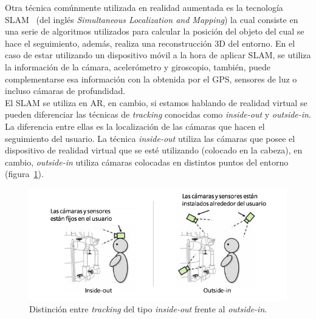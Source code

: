 Otra técnica comúnmente utilizada en realidad aumentada es la tecnología SLAM~\cite{arSLAM} (del inglés \textit{Simultaneous Localization and Mapping}) la cual consiste en una serie de algoritmos utilizados para calcular la posición del objeto del cual se hace el seguimiento, además, realiza una reconstrucción 3D del entorno. En el caso de estar utilizando un dispositivo móvil a la hora de aplicar SLAM, se utiliza la información de la cámara, acelerómetro y giroscopio, también, puede complementarse esa información con la obtenida por el GPS, sensores de luz o incluso cámaras de profundidad.\\

El SLAM se utiliza en AR, en cambio, si estamos hablando de realidad virtual se pueden diferenciar las técnicas de \textit{tracking} conocidas como \textit{inside-out} y \textit{outside-in}.\\

La diferencia entre ellas es la localización de las cámaras que hacen el seguimiento del usuario. La técnica \textit{inside-out} utiliza las cámaras que posee el dispositivo de realidad virtual que se esté utilizando (colocado en la cabeza), en cambio, \textit{outside-in} utiliza cámaras colocadas en distintos puntos del entorno (figura~\ref{fig:indiseoutvsoutsidein}).

\begin{figure}[H]
    \centering
    \includegraphics[scale=0.6]{Images/Estado del arte/vr-inside-out.png}
    \caption[Distinción entre \textit{tracking} del tipo \textit{inside-out} frente al \textit{outside-in}]{Distinción entre \textit{tracking} del tipo \textit{inside-out} frente al \textit{outside-in}\footnotemark.}
    \label{fig:indiseoutvsoutsidein}
\end{figure}